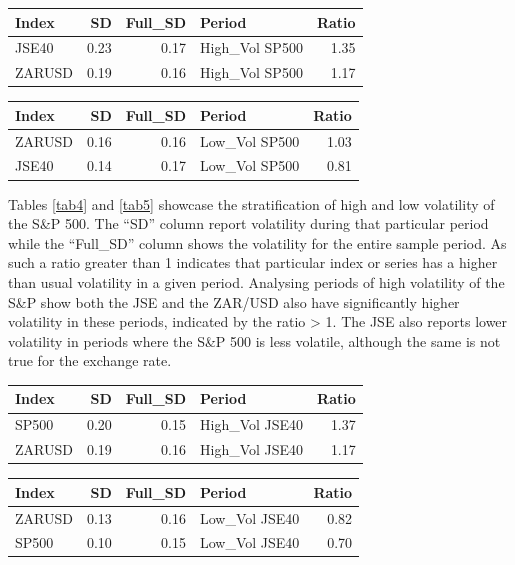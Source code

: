 \documentclass[11pt,preprint, authoryear]{elsarticle}
\let\origtable\table
\let\endorigtable\endtable
\renewenvironment{table}[1][2] {
    \expandafter\origtable\expandafter[H]
} {
    \endorigtable
}
\numberwithin{equation}{section}
\numberwithin{figure}{section}
\numberwithin{table}{section}
\begin{document}
\begin{table}[H]
\centering
\caption{S\&P 500 High Volatility \label{tab4}} 
\begin{tabular}{lrrlr}
  \hline
Index & SD & Full\_SD & Period & Ratio \\ 
  \hline
JSE40 & 0.23 & 0.17 & High\_Vol SP500 & 1.35 \\ 
  ZARUSD & 0.19 & 0.16 & High\_Vol SP500 & 1.17 \\ 
   \hline
\end{tabular}
\end{table}
\begin{table}[H]
\centering
\caption{S\&P 500 Low Volatility \label{tab5}} 
\begin{tabular}{lrrlr}
  \hline
Index & SD & Full\_SD & Period & Ratio \\ 
  \hline
ZARUSD & 0.16 & 0.16 & Low\_Vol SP500 & 1.03 \\ 
  JSE40 & 0.14 & 0.17 & Low\_Vol SP500 & 0.81 \\ 
   \hline
\end{tabular}
\end{table}

Tables \ref{tab4} and \ref{tab5} showcase the stratification of high and
low volatility of the S\&P 500. The ``SD'' column report volatility
during that particular period while the ``Full\_SD'' column shows the
volatility for the entire sample period. As such a ratio greater than 1
indicates that particular index or series has a higher than usual
volatility in a given period. Analysing periods of high volatility of
the S\&P show both the JSE and the ZAR/USD also have significantly
higher volatility in these periods, indicated by the ratio
\textgreater{} 1. The JSE also reports lower volatility in periods where
the S\&P 500 is less volatile, although the same is not true for the
exchange rate.

\begin{table}[H]
\centering
\caption{JSE Top 40 High Volatility \label{tab6}} 
\begin{tabular}{lrrlr}
  \hline
Index & SD & Full\_SD & Period & Ratio \\ 
  \hline
SP500 & 0.20 & 0.15 & High\_Vol JSE40 & 1.37 \\ 
  ZARUSD & 0.19 & 0.16 & High\_Vol JSE40 & 1.17 \\ 
   \hline
\end{tabular}
\end{table}
\begin{table}[H]
\centering
\caption{JSE Top 40 Low Volatility \label{tab7}} 
\begin{tabular}{lrrlr}
  \hline
Index & SD & Full\_SD & Period & Ratio \\ 
  \hline
ZARUSD & 0.13 & 0.16 & Low\_Vol JSE40 & 0.82 \\ 
  SP500 & 0.10 & 0.15 & Low\_Vol JSE40 & 0.70 \\ 
   \hline
\end{tabular}
\end{table}
\end{document}
